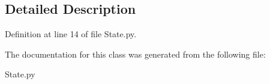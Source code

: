 \subsection{Detailed Description}


Definition at line 14 of file State.\+py.



The documentation for this class was generated from the following file\+:\begin{DoxyCompactItemize}
\item 
State.\+py\end{DoxyCompactItemize}
